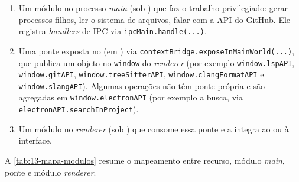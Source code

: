 \begin{enumerate}[leftmargin=*]
  \item Um módulo no processo \textit{main} (sob ) que faz o
        trabalho privilegiado: gerar processos filhos, ler o sistema de
        arquivos, falar com a API do GitHub. Ele registra \textit{handlers} de
        IPC via \lstinline|ipcMain.handle(...)|.
  \item Uma ponte exposta no  (em )
        via \lstinline|contextBridge.exposeInMainWorld(...)|, que publica um
        objeto no \lstinline|window| do \textit{renderer} (por exemplo
        \lstinline|window.lspAPI|, \lstinline|window.gitAPI|,
        \lstinline|window.treeSitterAPI|, \lstinline|window.clangFormatAPI| e
        \lstinline|window.slangAPI|). Algumas operações não têm ponte própria e
        são agregadas em \lstinline|window.electronAPI| (por exemplo a busca, via
        \lstinline|electronAPI.searchInProject|).
  \item Um módulo no \textit{renderer} (sob ) que consome essa
        ponte e a integra ao  ou à interface.
\end{enumerate}

A \autoref{tab:13-mapa-modulos} resume o mapeamento entre recurso, módulo
\textit{main}, ponte e módulo \textit{renderer}.


